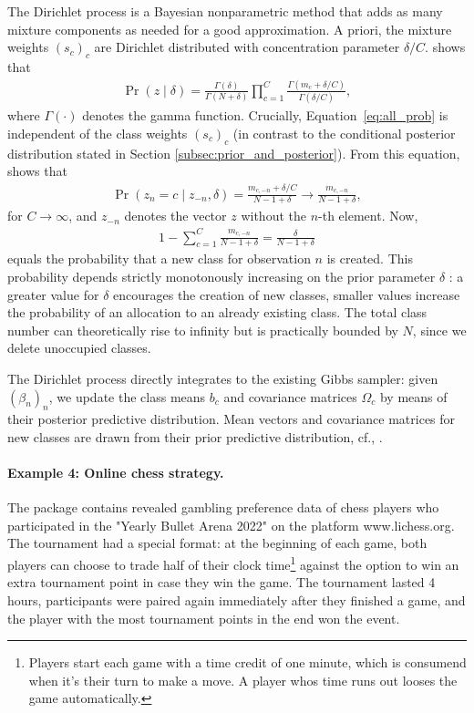 \documentclass[article,shortnames]{jss}
\begin{document}
The Dirichlet process is a Bayesian nonparametric method that adds as many mixture components as needed for a good approximation. A priori, the mixture weights $(s_c)_c$ are Dirichlet distributed with concentration parameter $\delta/C$. \cite{Rasmussen:2000} shows that
%
\begin{align}
  \label{eq:all_prob}
  \Pr(z \mid \delta) = \frac{\Gamma(\delta)}{\Gamma(N+\delta)} \prod_{c=1}^C \frac{\Gamma(m_c + \delta/C)}{\Gamma(\delta/C)},
\end{align}
%
where $\Gamma(\cdot)$ denotes the gamma function. Crucially, Equation~\ref{eq:all_prob} is independent of the class weights $(s_c)_c$ (in contrast to the conditional posterior distribution stated in Section \ref{subsec:prior_and_posterior}). From this equation, \cite{Li:2019} shows that
%
\begin{align*}
  \Pr(z_n = c \mid z_{-n}, \delta) = \frac{m_{c,-n} + \delta/C}{N-1+\delta} \to \frac{m_{c,-n}}{N-1+\delta},
\end{align*}
%
for $C \to \infty$, and $z_{-n}$ denotes the vector $z$ without the $n$-th element. Now,
%
\begin{align*}
  1 - \sum_{c = 1}^C \frac{m_{c,-n}}{N-1+\delta} = \frac{\delta}{N-1+\delta}
\end{align*}
%
equals the probability that a new class for observation $n$ is created. This probability depends strictly monotonously increasing on the prior parameter $\delta$ \citep{Neal:2000}: a greater value for $\delta$ encourages the creation of new classes, smaller values increase the probability of an allocation to an already existing class. The total class number can theoretically rise to infinity but is practically bounded by $N$, since we delete unoccupied classes.

The Dirichlet process directly integrates to the existing Gibbs sampler: given $(\beta_n)_n$, we update the class means $b_c$ and covariance matrices $\Omega_c$ by means of their posterior predictive distribution. Mean vectors and covariance matrices for new classes are drawn from their prior predictive distribution, cf., \cite{Li:2019}.

\paragraph{Example 4: Online chess strategy.}

The  package contains revealed gambling preference data of chess players who participated in the "Yearly Bullet Arena 2022" on the platform www.lichess.org. The tournament had a special format: at the beginning of each game, both players can choose to trade half of their clock time\footnote{Players start each game with a time credit of one minute, which is consumend when it's their turn to make a move. A player whos time runs out looses the game automatically.} against the option to win an extra tournament point in case they win the game. The tournament lasted 4 hours, participants were paired again immediately after they finished a game, and the player with the most tournament points in the end won the event.
\end{document}
